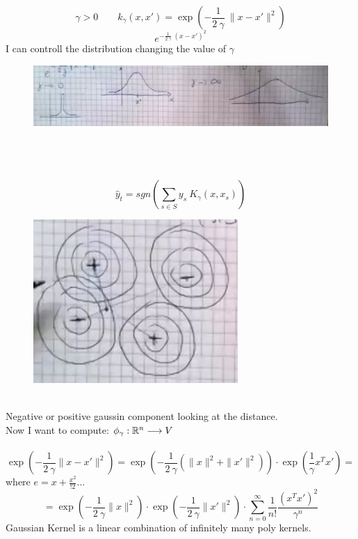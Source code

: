 \documentclass[../main.tex]{subfiles}
\begin{document}
$$\gamma > 0 \qquad k_{\gamma} (x, x') = \exp \left( - \frac{1}{2 \ \gamma} \ \| x- x' \|^2 \right)
$$
$$
e^{- \frac{1}{2 \ \gamma} \ \left(x - x' \right) ^2}
$$
I can controll the distribution changing the value of $\gamma$
\begin{figure}[h]
    \centering
    \includegraphics[width=0.8\linewidth]{../img/lez18-img2.JPG}
    \caption{} 
\end{figure}\\\\\\
$$
\hat{y}_t = sgn \left( \sum_{s \in S} y_s \ K_{\gamma} (x, x_s) \right)
$$
\begin{figure}[h]
    \centering
    \includegraphics[width=0.6\linewidth]{../img/lez18-img3.JPG}
    \caption{} 
\end{figure}\\
Negative or positive gaussin component looking at the distance. 
\\
Now I want to compute: $ \phi_\gamma : \mathbb{R}^n \longrightarrow V$
\\\\
$$
\exp \left( - \frac{1}{2 \ \gamma} \| x- x'\|^2 \right) = \exp \left(  - \frac{1}{2 \ \gamma} \left( \| x \|^2 + \| x'\|^2 \right) \right) \cdot \exp \left( \frac{1}{\gamma} x^T x'\right) =
$$
where $e = x+ \frac{x^2}{!2} ... $
$$
= \exp \left(  - \frac{1}{2 \ \gamma} \| x \|^2 \right) \cdot \exp \left(  - \frac{1}{2 \ \gamma} \| x' \|^2 \right) \cdot \sum_{n=0}^{\infty} \frac{1}{n! } \frac{\left( x^T x' \right)^2}{\gamma^n}
$$
Gaussian Kernel is a linear combination of infinitely many poly kernels.
\\
\end{document}
